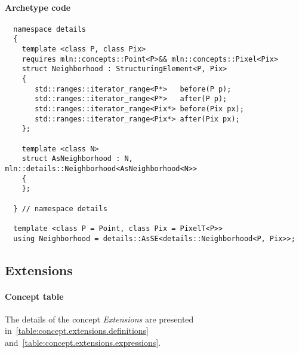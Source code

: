 \paragraph{Archetype code}

\begin{verbatim}
  namespace details
  {
    template <class P, class Pix>
    requires mln::concepts::Point<P>&& mln::concepts::Pixel<Pix>
    struct Neighborhood : StructuringElement<P, Pix>
    {
       std::ranges::iterator_range<P*>   before(P p);
       std::ranges::iterator_range<P*>   after(P p);
       std::ranges::iterator_range<Pix*> before(Pix px);
       std::ranges::iterator_range<Pix*> after(Pix px);
    };

    template <class N>
    struct AsNeighborhood : N, mln::details::Neighborhood<AsNeighborhood<N>>
    {
    };

  } // namespace details

  template <class P = Point, class Pix = PixelT<P>>
  using Neighborhood = details::AsSE<details::Neighborhood<P, Pix>>;
\end{verbatim}


\clearpage

\subsection{Extensions}

\paragraph{Concept table}

The details of the concept \emph{Extensions} are presented in~\cref{table:concept.extensions.definitions}
and~\cref{table:concept.extensions.expressions}.


